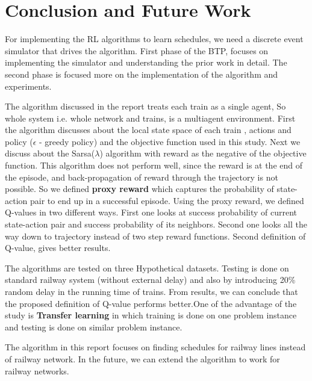 \chapter{Conclusion and Future Work}

For implementing the RL algorithms to learn schedules, we need a discrete event simulator 
that drives the algorithm. First phase of the BTP, focuses on implementing the simulator and 
understanding the prior work in detail. The second phase is focused more on the implementation of the 
algorithm and experiments. 

\vspace{\baselineskip}
The algorithm discussed in the report treats each train as a single agent, So whole system i.e. 
whole network and trains, is a multiagent environment. First the algorithm discusses about the 
local state space of each train , actions and policy ($\epsilon$ - greedy policy) and the objective
function used in this study. Next we discuss about the Sarsa($\lambda$) algorithm with reward as the negative 
of the objective function. This algorithm does not perform well, since the reward is at the end of the episode, 
and back-propagation of reward through the trajectory is not possible. So we defined \textbf{proxy reward} which 
captures the probability of state-action pair to end up in a successful episode. Using the proxy reward,
we defined Q-values in two different ways. First one looks at success probability of current state-action pair 
and success probability of its neighbors. Second one looks all the way down to trajectory instead of 
two step reward functions. Second definition of Q-value, gives better results.

\vspace{\baselineskip}
The algorithms are tested on three Hypothetical datasets. Testing is done on standard railway system 
(without external delay) and 
also by introducing 20\% random delay in the running time of trains. From results, we can conclude that the 
proposed definition of Q-value performs better.One of the advantage of the study is \textbf{Transfer learning}
in which training is done on one 
problem instance and testing is done on similar problem instance.

\vspace{\baselineskip}
The algorithm in this report focuses on finding schedules for railway lines instead of railway network.
In the future, we can extend the algorithm to work for railway networks. 

